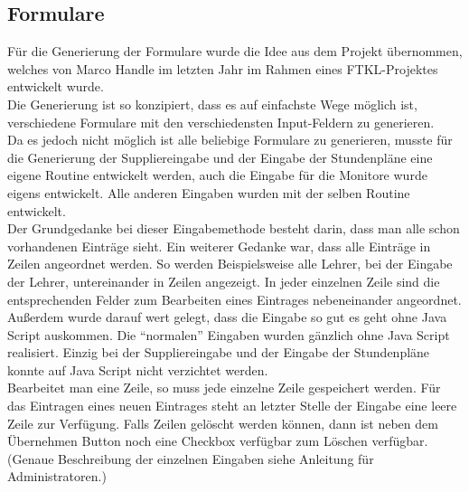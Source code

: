 \subsection{Formulare} \label{sec:content_draft_form}
Für die Generierung der Formulare wurde die Idee aus dem Projekt übernommen, welches von Marco Handle im letzten Jahr im Rahmen eines FTKL-Projektes entwickelt wurde.\\
Die Generierung ist so konzipiert, dass es auf einfachste Wege möglich ist, verschiedene Formulare mit den verschiedensten Input-Feldern zu generieren.\\
Da es jedoch nicht möglich ist alle beliebige Formulare zu generieren, musste für die Generierung der Suppliereingabe und der Eingabe der Stundenpläne eine eigene Routine entwickelt werden, auch die Eingabe für die Monitore wurde eigens entwickelt. Alle anderen Eingaben wurden mit der selben Routine entwickelt.\\
Der Grundgedanke bei dieser Eingabemethode besteht darin, dass man alle schon vorhandenen Einträge sieht. Ein weiterer Gedanke war, dass alle Einträge in Zeilen angeordnet werden. So werden Beispielsweise alle Lehrer, bei der Eingabe der Lehrer, untereinander in Zeilen angezeigt. In jeder einzelnen Zeile sind die entsprechenden Felder zum Bearbeiten eines Eintrages nebeneinander angeordnet. Außerdem wurde darauf wert gelegt, dass die Eingabe so gut es geht ohne Java Script auskommen. Die \enquote{normalen} Eingaben wurden gänzlich ohne Java Script realisiert. Einzig bei der Suppliereingabe und der Eingabe der Stundenpläne konnte auf Java Script nicht verzichtet werden.\\
Bearbeitet man eine Zeile, so muss jede einzelne Zeile gespeichert werden. Für das Eintragen eines neuen Eintrages steht an letzter Stelle der Eingabe eine leere Zeile zur Verfügung. Falls Zeilen gelöscht werden können, dann ist neben dem Übernehmen Button noch eine Checkbox verfügbar zum Löschen verfügbar. (Genaue Beschreibung der einzelnen Eingaben siehe Anleitung für Administratoren.)\\

